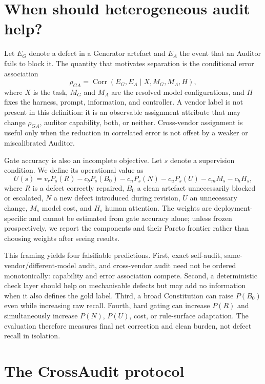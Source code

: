 \documentclass[11pt]{article}
\begin{document}
\section{When should heterogeneous audit help?}\label{sec:formal}

Let $E_G$ denote a defect in a Generator artefact and $E_A$ the event that an Auditor fails to block it. The quantity that motivates separation is the conditional error association
\begin{equation}
\rho_{GA}=\operatorname{Corr}(E_G,E_A\mid X,M_G,M_A,H),
\end{equation}
where $X$ is the task, $M_G$ and $M_A$ are the resolved model configurations, and $H$ fixes the harness, prompt, information, and controller. A vendor label is not present in this definition: it is an observable assignment attribute that may change $\rho_{GA}$, auditor capability, both, or neither. Cross-vendor assignment is useful only when the reduction in correlated error is not offset by a weaker or miscalibrated Auditor.

Gate accuracy is also an incomplete objective. Let $s$ denote a supervision condition. We define its operational value as
\begin{equation}
U(s)=v_r P_s(R)-c_bP_s(B_0)-c_nP_s(N)-c_uP_s(U)-c_mM_s-c_hH_s,
\label{eq:utility}
\end{equation}
where $R$ is a defect correctly repaired, $B_0$ a clean artefact unnecessarily blocked or escalated, $N$ a new defect introduced during revision, $U$ an unnecessary change, $M_s$ model cost, and $H_s$ human attention. The weights are deployment-specific and cannot be estimated from gate accuracy alone; unless frozen prospectively, we report the components and their Pareto frontier rather than choosing weights after seeing results.

This framing yields four falsifiable predictions. First, exact self-audit, same-vendor/different-model audit, and cross-vendor audit need not be ordered monotonically: capability and error association compete. Second, a deterministic check layer should help on mechanisable defects but may add no information when it also defines the gold label. Third, a broad Constitution can raise $P(B_0)$ even while increasing raw recall. Fourth, hard gating can increase $P(R)$ and simultaneously increase $P(N)$, $P(U)$, cost, or rule-surface adaptation. The evaluation therefore measures final net correction and clean burden, not defect recall in isolation.

\section{The CrossAudit protocol}\label{sec:protocol}
\end{document}
